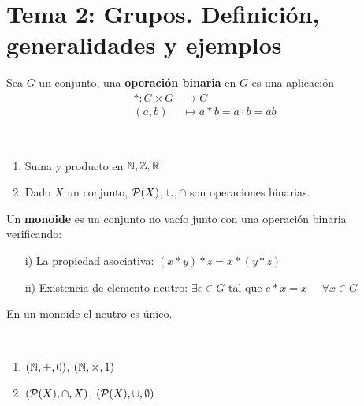 \chapter{Tema 2: Grupos. Definición, generalidades y ejemplos}

\begin{definicion}
    Sea $G$ un conjunto, una \textbf{operación binaria} en $G$ es una aplicación
    \begin{align*}
        \ast : G\times G &\to G\\
        (a,b) & \mapsto a\ast b = a \cdot b = ab
    \end{align*} 
\end{definicion}

\begin{ejemplo}\
    \begin{enumerate}
        \item Suma y producto en $\mathbb{N}, \mathbb{Z}, \mathbb{R}$
        \item Dado $X$ un conjunto, $\mathcal{P}(X)$, $\cup, \cap $ son operaciones binarias.
    \end{enumerate}
\end{ejemplo}

\begin{definicion}
    Un \textbf{monoide} es un conjunto no vacío junto con una operación binaria verificando:
    \begin{enumerate}
        \item[i)] La propiedad asociativa: $(x\ast y) \ast z = x \ast (y \ast z)$
        \item[ii)] Existencia de elemento neutro: $\exists e \in G$ tal que $e\ast x = x$ \ \ $\forall x \in G$
    \end{enumerate}
\end{definicion}

\begin{lema}
    En un monoide el neutro es único.
\end{lema}

\begin{ejemplo}\
    \begin{enumerate}
        \item $(\mathbb{N},+,0)$, $(\mathbb{N},\times,1)$
        \item $(\mathcal{P}(X), \cap, X)$, $(\mathcal{P}(X), \cup, \emptyset)$
    \end{enumerate}
\end{ejemplo}


